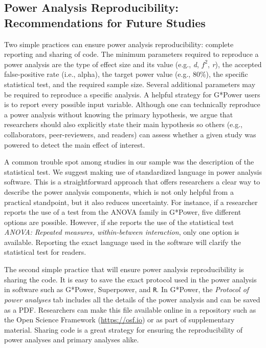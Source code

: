 \documentclass[
  doc, donotrepeattitle,floatsintext]{apa7}
\begin{document}
\hypertarget{power-analysis-reproducibility-recommendations-for-future-studies}{%
\subsection{Power Analysis Reproducibility: Recommendations for Future Studies}\label{power-analysis-reproducibility-recommendations-for-future-studies}}

Two simple practices can ensure power analysis reproducibility: complete reporting and sharing of code. The minimum parameters required to reproduce a power analysis are the type of effect size and its value (e.g., \emph{d}, \(f^2\), \emph{r}), the accepted false-positive rate (i.e., alpha), the target power value (e.g., 80\%), the specific statistical test, and the required sample size. Several additional parameters may be required to reproduce a specific analysis. A helpful strategy for G*Power users is to report every possible input variable. Although one can technically reproduce a power analysis without knowing the primary hypothesis, we argue that researchers should also explicitly state their main hypothesis so others (e.g., collaborators, peer-reviewers, and readers) can assess whether a given study was powered to detect the main effect of interest.

A common trouble spot among studies in our sample was the description of the statistical test. We suggest making use of standardized language in power analysis software. This is a straightforward approach that offers researchers a clear way to describe the power analysis components, which is not only helpful from a practical standpoint, but it also reduces uncertainty. For instance, if a researcher reports the use of a test from the ANOVA family in G*Power, five different options are possible. However, if she reports the use of the statistical test \emph{ANOVA: Repeated measures, within-between interaction}, only one option is available. Reporting the exact language used in the software will clarify the statistical test for readers.

The second simple practice that will ensure power analysis reproducibility is sharing the code. It is easy to save the exact protocol used in the power analysis in software such as G*Power, Superpower, and \texttt{R}. In G*Power, the \emph{Protocol of power analyses} tab includes all the details of the power analysis and can be saved as a PDF. Researchers can make this file available online in a repository such as the Open Science Framework (\url{https://osf.io}) or as part of supplementary material. Sharing code is a great strategy for ensuring the reproducibility of power analyses and primary analyses alike.
\end{document}
